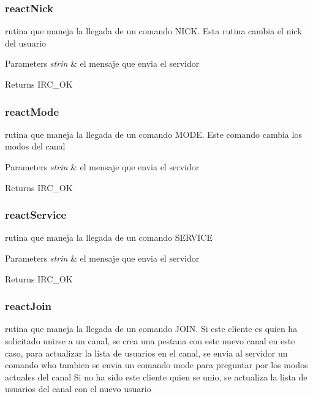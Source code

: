  \hypertarget{reactNick}{}\subsubsection{react\-Nick}\label{reactNick}
rutina que maneja la llegada de un comando N\-I\-C\-K. Esta rutina cambia el nick del usuario


\begin{DoxyParams}{Parameters}
{\em strin} & el mensaje que envia el servidor\\
\hline
\end{DoxyParams}
\begin{DoxyReturn}{Returns}
I\-R\-C\-\_\-\-O\-K
\end{DoxyReturn}


 \hypertarget{reactMode}{}\subsubsection{react\-Mode}\label{reactMode}
rutina que maneja la llegada de un comando M\-O\-D\-E. Este comando cambia los modos del canal


\begin{DoxyParams}{Parameters}
{\em strin} & el mensaje que envia el servidor\\
\hline
\end{DoxyParams}
\begin{DoxyReturn}{Returns}
I\-R\-C\-\_\-\-O\-K
\end{DoxyReturn}


 \hypertarget{reactService}{}\subsubsection{react\-Service}\label{reactService}
rutina que maneja la llegada de un comando S\-E\-R\-V\-I\-C\-E


\begin{DoxyParams}{Parameters}
{\em strin} & el mensaje que envia el servidor\\
\hline
\end{DoxyParams}
\begin{DoxyReturn}{Returns}
I\-R\-C\-\_\-\-O\-K
\end{DoxyReturn}


 \hypertarget{reactJoin}{}\subsubsection{react\-Join}\label{reactJoin}
rutina que maneja la llegada de un comando J\-O\-I\-N. Si este cliente es quien ha solicitado unirse a un canal, se crea una pestana con este nuevo canal en este caso, para actualizar la lista de usuarios en el canal, se envia al servidor un comando who tambien se envia un comando mode para preguntar por los modos actuales del canal Si no ha sido este cliente quien se unio, se actualiza la lista de usuarios del canal con el nuevo usuario


